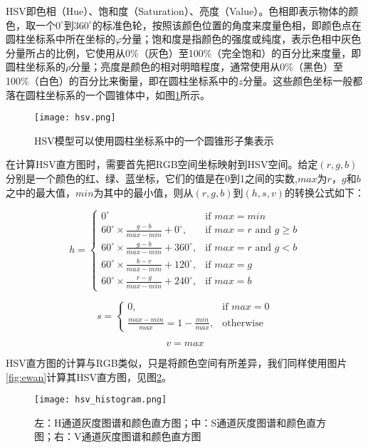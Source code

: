   HSV即色相（Hue）、饱和度（Saturation）、亮度（Value）。色相即表示物体的颜色，取一个$0^{\circ}$到$360^{\circ}$的标准色轮，按照该颜色位置的角度来度量色相，即颜色点在圆柱坐标系中所在坐标的$\varphi$分量；饱和度是指颜色的强度或纯度，表示色相中灰色分量所占的比例，它使用从0\%（灰色）至100\%（完全饱和）的百分比来度量，即圆柱坐标系的$\rho$分量；亮度是颜色的相对明暗程度，通常使用从0\%（黑色）至100\%（白色）的百分比来衡量，即在圆柱坐标系中的$z$分量。这些颜色坐标一般都落在圆柱坐标系的一个圆锥体中，如图\ref{fig:hsv}所示。

\begin{figure}[htb]
  \centering
  \texttt{[image: hsv.png]}
  \caption{HSV模型可以使用圆柱坐标系中的一个圆锥形子集表示}
  \label{fig:hsv}
\end{figure}

  在计算HSV直方图时，需要首先把RGB空间坐标映射到HSV空间。给定$(r,g,b)$分别是一个颜色的红、绿、蓝坐标，它们的值是在0到1之间的实数,$max$为$r$，$g$和$b$之中的最大值，$min$为其中的最小值，则从$(r,g,b)$到$(h,s,v)$的转换公式如下：\cite{foley1982fundamentals}

$$h={\begin{cases}0^{\circ }&{\mbox{if }}max=min\\60^{\circ }\times {\frac  {g-b}{max-min}}+0^{\circ },&{\mbox{if }}max=r{\mbox{ and }}g\geq b\\60^{\circ }\times {\frac  {g-b}{max-min}}+360^{\circ },&{\mbox{if }}max=r{\mbox{ and }}g<b\\60^{\circ }\times {\frac  {b-r}{max-min}}+120^{\circ },&{\mbox{if }}max=g\\60^{\circ }\times {\frac  {r-g}{max-min}}+240^{\circ },&{\mbox{if }}max=b\end{cases}}$$

$$s={\begin{cases}0,&{\mbox{if }}max=0\\{\frac  {max-min}{max}}=1-{\frac  {min}{max}},&{\mbox{otherwise}}\end{cases}}$$

$$
v=max
$$

  HSV直方图的计算与RGB类似，只是将颜色空间有所差异，我们同样使用图片\ref{fig:ewan}计算其HSV直方图，见图\ref{fig:hsvhistogram}。

\begin{figure}[htb]
  \centering
  \texttt{[image: hsv\_histogram.png]}
  \caption{左：H通道灰度图谱和颜色直方图；中：S通道灰度图谱和颜色直方图；右：V通道灰度图谱和颜色直方图}
  \label{fig:hsvhistogram}
\end{figure}

